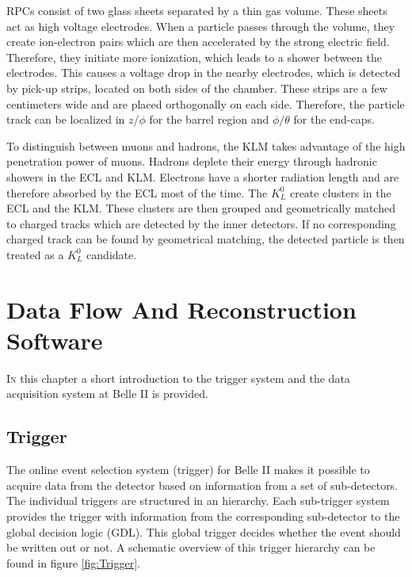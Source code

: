 \documentclass[a4paper,11pt,twosided,final,german,openbib,pdftex,listof=totoc,bibliography=totoc]{scrbook}
\begin{document}
RPCs consist of two glass sheets separated by a thin gas volume. These sheets act as high voltage electrodes. When a particle passes through the volume, they create ion-electron pairs which are then accelerated by the strong electric field. Therefore, they initiate more ionization, which leads to a shower between the electrodes. This causes a voltage drop in the nearby electrodes, which is detected by pick-up strips, located on both sides of the chamber. These strips are a few centimeters wide and are placed orthogonally on each side. Therefore, the particle track can be localized in $z/\phi$ for the barrel region and $\phi/\theta$ for the end-caps.

To distinguish between muons and hadrons, the KLM takes advantage of the high penetration power of muons. Hadrons deplete their energy through hadronic showers in the ECL and KLM. Electrons have a shorter radiation length and are therefore absorbed by the ECL most of the time. The $K_L^0$ create clusters in the ECL and the KLM. These clusters are then grouped and geometrically matched to charged tracks which are detected by the inner detectors. If no corresponding charged track can be found by geometrical matching, the detected particle is then treated as a $K_L^0$ candidate.\cite{B2TR}\cite{KLMS}



\chapter{Data Flow And Reconstruction Software}
\label{sec:TDAS}


\lettrine{I}{n} this chapter a short introduction to the trigger system and the data acquisition system at Belle II is provided.


\section{Trigger}

The online event selection system (trigger) for Belle II makes it possible to acquire data from the detector based on information from a set of sub-detectors. The individual triggers are structured in an hierarchy. Each sub-trigger system provides the trigger with information from the corresponding sub-detector to the global decision logic (GDL). This global trigger decides whether the event should be written out or not. \cite{B2TR} A schematic overview of this trigger hierarchy can be found in figure \ref{fig:Trigger}.
\end{document}

